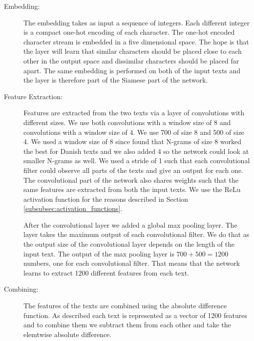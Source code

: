 \begin{description}

    \item[Embedding:]

        The embedding takes as input a sequence of integers. Each different
        integer is a compact one-hot encoding of each character. The one-hot
        encoded character stream is embedded in a five dimensional space. The
        hope is that the layer will learn that similar characters should be
        placed close to each other in the output space and dissimilar characters
        should be placed far apart. The same embedding is performed on both of
        the input texts and the layer is therefore part of the Siamese part of
        the network.

    \item[Feature Extraction:]

        Features are extracted from the two texts via a layer of convolutions
        with different sizes. We use both convolutions with a window size of
        8 and convolutions with a window size of 4. We use 700 of size 8 and
        500 of size 4. We used a window size of 8 since \citet{aalykke2016}
        found that N-grams of size 8 worked the best for Danish texts and we
        also added 4 so the network could look at smaller N-grams as well.
        We used a stride of 1 such that each convolutional filter could
        observe all parts of the texts and give an output for each one. The
        convolutional part of the network also shares weights such that the
        same features are extracted from both the input texts. We use the
        \gls{ReLu} activation function for the reasons described in Section
        \ref{subsubsec:activation_functions}.

        After the convolutional layer we added a global max pooling layer. The
        layer takes the maximum output of each convolutional filter. We do that
        as the output size of the convolutional layer depends on the length of
        the input text. The output of the max pooling layer is $700 + 500 =
        1200$ numbers, one for each convolutional filter. That means that the
        network learns to extract 1200 different features from each text.

    \item[Combining:]

        The features of the texts are combined using the absolute difference
        function. As described each text is represented as a vector of 1200
        features and to combine them we subtract them from each other and take
        the elemtwise absolute difference.


\end{description}
